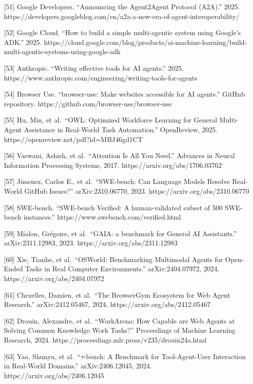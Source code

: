 \documentclass[
  11pt,
]{article}
\begin{document}
{[}51{]} Google Developers. ``Announcing the Agent2Agent Protocol
(A2A).'' 2025.
https://developers.googleblog.com/en/a2a-a-new-era-of-agent-interoperability/

{[}52{]} Google Cloud. ``How to build a simple multi-agentic system
using Google's ADK.'' 2025.
https://cloud.google.com/blog/products/ai-machine-learning/build-multi-agentic-systems-using-google-adk

{[}53{]} Anthropic. ``Writing effective tools for AI agents.'' 2025.
https://www.anthropic.com/engineering/writing-tools-for-agents

{[}54{]} Browser Use. ``browser-use: Make websites accessible for AI
agents.'' GitHub repository. https://github.com/browser-use/browser-use

{[}55{]} Hu, Min, et al.~``OWL: Optimized Workforce Learning for General
Multi-Agent Assistance in Real-World Task Automation.'' OpenReview,
2025. https://openreview.net/pdf?id=MBJ46gd1CT

{[}56{]} Vaswani, Ashish, et al.~``Attention Is All You Need.'' Advances
in Neural Information Processing Systems, 2017.
https://arxiv.org/abs/1706.03762

{[}57{]} Jimenez, Carlos E., et al.~``SWE-bench: Can Language Models
Resolve Real-World GitHub Issues?'' arXiv:2310.06770, 2023.
https://arxiv.org/abs/2310.06770

{[}58{]} SWE-bench. ``SWE-bench Verified: A human-validated subset of
500 SWE-bench instances.'' https://www.swebench.com/verified.html

{[}59{]} Mialon, Grégoire, et al.~``GAIA: a benchmark for General AI
Assistants.'' arXiv:2311.12983, 2023. https://arxiv.org/abs/2311.12983

{[}60{]} Xie, Tianhe, et al.~``OSWorld: Benchmarking Multimodal Agents
for Open-Ended Tasks in Real Computer Environments.'' arXiv:2404.07972,
2024. https://arxiv.org/abs/2404.07972

{[}61{]} Chezelles, Damien, et al.~``The BrowserGym Ecosystem for Web
Agent Research.'' arXiv:2412.05467, 2024.
https://arxiv.org/abs/2412.05467

{[}62{]} Drouin, Alexandre, et al.~``WorkArena: How Capable are Web
Agents at Solving Common Knowledge Work Tasks?'' Proceedings of Machine
Learning Research, 2024.
https://proceedings.mlr.press/v235/drouin24a.html

{[}63{]} Yao, Shunyu, et al.~``\(\tau\)-bench: A Benchmark for
Tool-Agent-User Interaction in Real-World Domains.'' arXiv:2406.12045,
2024. https://arxiv.org/abs/2406.12045
\end{document}
